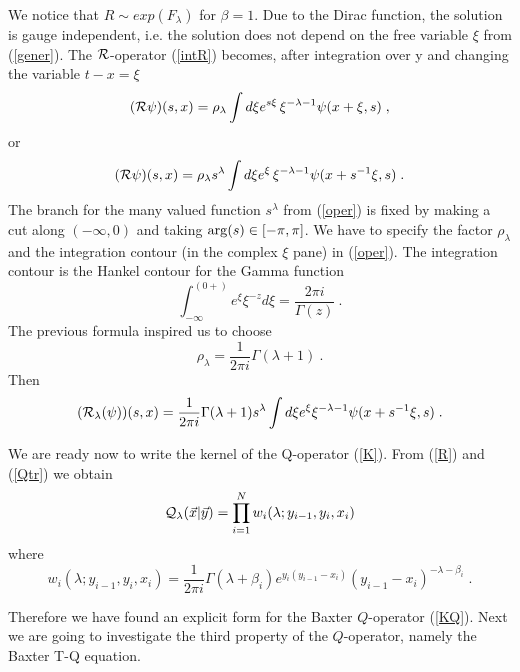 \documentclass[a4paper,11pt]{article}
\begin{document}
We notice that $R\sim exp(F_{\lambda})$ for $\beta=1$. Due to the Dirac
function, the solution is gauge independent, i.e. the solution does not
depend on the free variable $\xi $ from (\ref{gener}). The ${\cal
R}$-operator (\ref {intR}) becomes, after integration over y and changing
the variable $t-x=\xi$
\begin{equation}
\label{ope}
({\cal R}\psi )(s,x)
     =\rho _{\lambda}\int d\xi e^{s\xi}\,\xi^{-\lambda -1}\psi(x+\xi,s)\;,
\end{equation}
 or
\begin{equation}
\label{oper}
({\cal R}\psi )(s,x)
     =\rho _{\lambda} s^{\lambda}\int d\xi e^{\xi}\,
      \xi ^{-\lambda -1}\psi(x+s^{-1}\xi,s)\;.
\end{equation}
The branch for the many valued function $s^{\lambda}$ from (\ref{oper}) is
fixed by making a cut along $(-\infty , 0)$ and taking ${\rm arg}(s) \in
[-\pi, \pi]$. We have to specify the factor $\rho _\lambda $ and the
integration contour (in the complex $\xi$ pane) in (\ref{oper}). The
integration contour is the Hankel contour for the Gamma function
\cite{Olver}
\begin{equation}
\label{G}
\int_{-\infty}^{(0+)}e^{\xi} \xi^{-z}d\xi=\frac{2\pi i}{\Gamma(z)} ~.
\end{equation}
The previous formula inspired us to choose
\begin{equation}
\label{ro}
\rho_\lambda=\frac{1}{2\pi i}\Gamma (\lambda +1) ~.
\end{equation}
Then
\begin{equation}
\label{oper_basis}
({\cal R}_\lambda(\psi))(s,x)
      =\frac{1}{2\pi i}\Gamma(\lambda +1)s^{\lambda}\int d\xi
      e^{\xi}\xi^{-\lambda -1}\psi(x+s^{-1}\xi,s)\;.
\end{equation}

We are ready now to write the kernel of the Q-operator (\ref{K}). From
(\ref{R}) and (\ref{Qtr}) we obtain
\begin{equation}
\label{KQ}
{\cal Q}_\lambda ({\vec x}|{\vec y})=\prod_{i=1}^N w_i(\lambda ;y_{i-1},y_i,x_i)
\end{equation}
where
\begin{equation}
\label{w-i}
w_i(\lambda ;y_{i-1},y_i,x_i)
     =\frac{1}{2\pi i}\Gamma (\lambda +\beta_i )
     e^{y_i(y_{i-1}-x_i)}(y_{i-1}-x_i)^{-\lambda -\beta_i}\;.
\end{equation}

Therefore we have found an explicit form for the Baxter $Q$-operator
(\ref{KQ}). Next we are going to investigate the third property of the
$Q$-operator, namely the Baxter T-Q equation.
\end{document}
